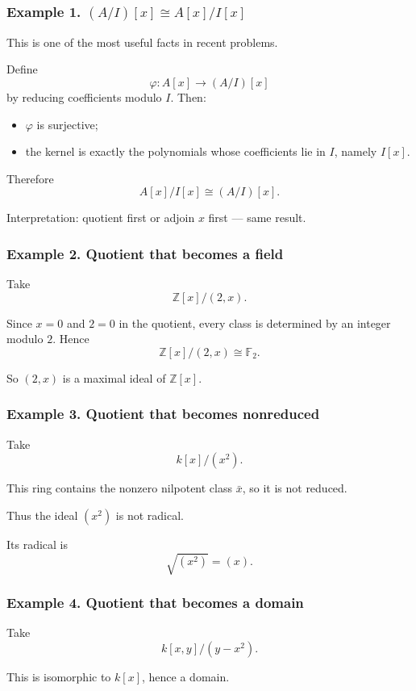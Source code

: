 \documentclass[12pt,a4paper]{article}
\theoremstyle{plain}
\theoremstyle{definition}      %
\begin{document}
	\subsubsection*{Example 1. \((A/I)[x]\cong A[x]/I[x]\)}
	
	This is one of the most useful facts in recent problems.
	
	Define
	\[
	\varphi:A[x]\to (A/I)[x]
	\]
	by reducing coefficients modulo \(I\). Then:
	\begin{itemize}
		\item \(\varphi\) is surjective;
		\item the kernel is exactly the polynomials whose coefficients lie in \(I\), namely \(I[x]\).
	\end{itemize}
	
	Therefore
	\[
	A[x]/I[x]\cong (A/I)[x].
	\]
	
	Interpretation: quotient first or adjoin \(x\) first --- same result.
	
	\subsubsection*{Example 2. Quotient that becomes a field}
	
	Take
	\[
	\mathbb Z[x]/(2,x).
	\]
	
	Since \(x=0\) and \(2=0\) in the quotient, every class is determined by an integer modulo \(2\). Hence
	\[
	\mathbb Z[x]/(2,x)\cong \mathbb F_2.
	\]
	
	So \((2,x)\) is a maximal ideal of \(\mathbb Z[x]\).
	
	\subsubsection*{Example 3. Quotient that becomes nonreduced}
	
	Take
	\[
	k[x]/(x^2).
	\]
	
	This ring contains the nonzero nilpotent class \(\bar x\), so it is not reduced.
	
	Thus the ideal \((x^2)\) is not radical.
	
	Its radical is
	\[
	\sqrt{(x^2)}=(x).
	\]
	
	\subsubsection*{Example 4. Quotient that becomes a domain}
	
	Take
	\[
	k[x,y]/(y-x^2).
	\]
	
	This is isomorphic to \(k[x]\), hence a domain.
	
\end{document}
